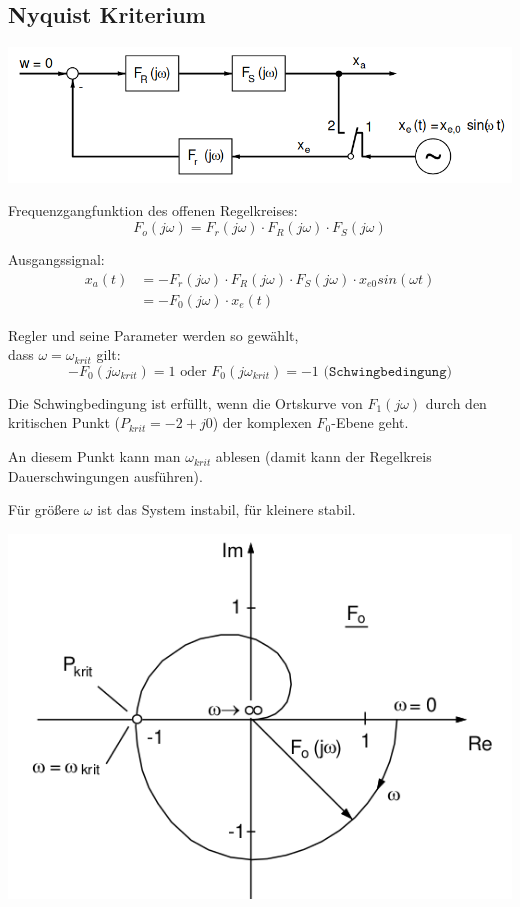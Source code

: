 \documentclass[10pt,a4paper]{article}
\begin{document}
\subsection{Nyquist Kriterium}
\begin{center}
	\includegraphics[width=.45\textwidth]{Figures/Nyquist.png}
\end{center}
Frequenzgangfunktion des offenen Regelkreises:
\[
	F_o (j\omega) = F_r (j\omega) \cdot F_R (j\omega) \cdot F_S (j\omega)
\]

Ausgangssignal:
\begin{align*}
	x_a(t) & =-F_r (j\omega) \cdot F_R (j\omega) \cdot F_S (j\omega) \cdot
	x_{e0}sin(\omega t)                                                    \\
	       & = -F_0 (j\omega) \cdot x_e (t)
\end{align*}

Regler und seine Parameter werden so gewählt,\\ dass $\omega = \omega_{krit}$ gilt:
\[
	-F_0 (j\omega_{krit})=1 \text{ oder } F_0 (j\omega_{krit})=-1 \texttt{ (Schwingbedingung)}
\]

\begin{mdframed}[style=exercise]
	Die Schwingbedingung ist erfüllt, wenn die Ortskurve von $F_1 (j\omega)$
	durch den kritischen Punkt ($P_{krit} = -2+j0$) der komplexen $F_0$-Ebene
	geht.

	An diesem Punkt kann man $\omega_{krit}$ ablesen (damit kann der Regelkreis
	Dauerschwingungen ausführen).

	Für größere $\omega$ ist das System instabil, für kleinere stabil.
\end{mdframed}

\includegraphics[width=0.94\columnwidth]{Figures/Nyquistwkrit.png}
\end{document}
